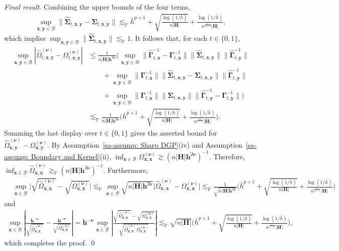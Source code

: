 \documentclass[10pt]{article}
\renewcommand{\P}{\mathbb{P}}
\newcommand{\lessp}{\lesssim_{\mathbb{P}}}
\newcommand{\bh}{\mathbf{h}}
\newcommand{\bH}{\mathbf{H}}
\newcommand{\bx}{\mathbf{x}}
\newcommand{\by}{\mathbf{y}}
\newcommand{\bnu}{\boldsymbol{\nu}}
\newcommand{\bGamma}{\boldsymbol{\Gamma}}
\newcommand{\bSigma}{\boldsymbol{\Sigma}}
\newcommand{\B}{\mathcal{B}}
\begin{document}
\medskip\textit{Final result}. Combining the upper bounds of the four terms,
\begin{align*}
    \sup_{\bx,\by \in \B} \big\|\widehat{\bSigma}_{t, \bx,\by} - \bSigma_{t, \bx,\by} \big\|
    \lessp \bar{h}^{p+1} + \sqrt{\frac{\log (1/\bar{h})}{n |\bH|}} + \frac{\log (1/\bar{h})}{n^{\frac{v}{2+v}}|\bH|},
\end{align*}
which implies $\sup_{\bx, \by \in \B} \|\widehat{\bSigma}_{t,\bx,\by}\| \lessp 1$. It follows that, for each $t\in\{0,1\}$,
\begin{align*}
    \sup_{\bx, \by \in \B}  |\widehat{\Omega}_{t,\bx,\by}^{(\bnu)} - \Omega_{t,\bx,\by}^{(\bnu)}|
    & \leq  \frac{1}{n |\bH|\bh^{2\bnu}}  \Big( \sup_{\bx, \by \in \B} \big\|\widehat{\bGamma}_{t,\bx}^{-1} - \bGamma_{t,\bx}^{-1} \big\| \big\|\widehat{\bSigma}_{t,\bx,\by}\big\| \big\|\widehat{\bGamma}_{t,\by}^{-1}\big\|\\
    &\qquad +  \sup_{\bx, \by \in \B} \big\|\bGamma_{t,\bx}^{-1}\big\|  \big\|\widehat{\bSigma}_{t,\bx,\by} - \bSigma_{t,\bx,\by}\big\| \big\|\widehat{\bGamma}_{t,\by}^{-1}\big\|\\
    &\qquad +  \sup_{\bx, \by \in \B} \big\|\bGamma_{t,\bx}^{-1}\big\| \big\|\bSigma_{t,\bx,\by}\big\| \big\|\widehat{\bGamma}_{t,\by}^{-1} - \bGamma_{t,\by}^{-1}\big\| \Big) \\
    & \lesssim_\P \frac{1}{n |\bH|\bh^{2\bnu}} \Big(\bar{h}^{p+1} + \sqrt{\frac{\log (1/\bar{h})}{n |\bH|}} + \frac{\log (1/\bar{h})}{n^{\frac{v}{2+v}}|\bH|}\Big).
\end{align*}
Summing the last display over $t\in\{0,1\}$ gives the asserted bound for $\widehat{\Omega}_{\bx,\by}^{(\bnu)} - \Omega_{\bx,\by}^{(\bnu)}$. By Assumption~\ref{sa-assump: Sharp DGP}(iv) and Assumption~\ref{sa-assump: Boundary and Kernel}(ii), $\inf_{\bx \in \B}\Omega_{\bx,\bx}^{(\bnu)} \gtrsim (n |\bH|\bh^{2\bnu})^{-1}$. Therefore, $\inf_{\bx \in \B}\widehat{\Omega}_{\bx,\bx}^{(\bnu)} \gtrsim_{\P} (n |\bH|\bh^{2\bnu})^{-1}$. Furthermore,
\begin{align*}
    & \sup_{\bx \in \B} \Big|\sqrt{\widehat{\Omega}_{\bx,\bx}^{(\bnu)}} - \sqrt{\Omega_{\bx,\bx}^{(\bnu)}}\Big|
    \lessp \sup_{\bx \in \B}\sqrt{n |\bH|\bh^{2\bnu}} \Big|\widehat{\Omega}_{\bx,\bx}^{(\bnu)} - \Omega_{\bx,\bx}^{(\bnu)}\Big|
    \lessp \frac{1}{\sqrt{n |\bH|\bh^{2\bnu}}} \Big(\bar{h}^{p+1} + \sqrt{\frac{\log (1/\bar{h})}{n |\bH|}} + \frac{\log (1/\bar{h})}{n^{\frac{v}{2+v}}|\bH|}\Big)
\end{align*}
and
\begin{align*}
    \sup_{\bx \in \B} \left|\frac{\bh^{-\bnu}}{\sqrt{\widehat{\Omega}_{\bx,\bx}^{(\bnu)}}} - \frac{\bh^{-\bnu}}{\sqrt{\Omega_{\bx,\bx}^{(\bnu)}}}\right|
    = \bh^{-\bnu}\sup_{\bx \in \B} \left|\frac{\sqrt{\widehat{\Omega}_{\bx,\bx}^{(\bnu)}} - \sqrt{\Omega_{\bx,\bx}^{(\bnu)}}}{\sqrt{\widehat{\Omega}_{\bx,\bx}^{(\bnu)} \Omega_{\bx,\bx}^{(\bnu)}}} \right|
    \lessp \sqrt{n |\bH|} \Big(\bar{h}^{p+1} + \sqrt{\frac{\log (1/\bar{h})}{n |\bH|}} + \frac{\log (1/\bar{h})}{n^{\frac{v}{2+v}}|\bH|}\Big),
\end{align*}
which completes the proof.
\qed
\end{document}
